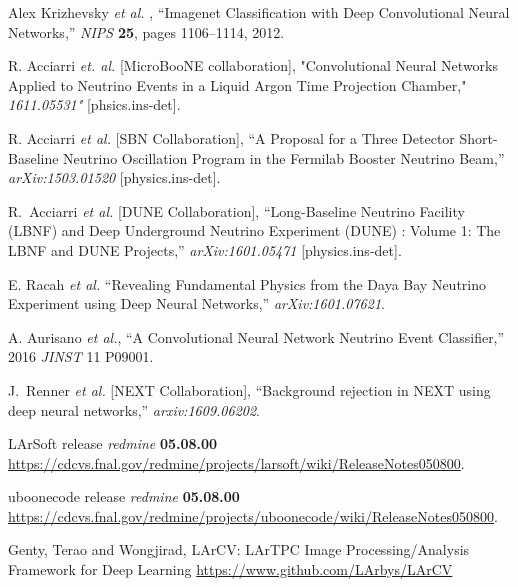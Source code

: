 \documentclass[11pt,a4paper]{article}
\begin{document}

\newpage
%
\begin{thebibliography}{9}

  Alex Krizhevsky {\it et al. },
  ``Imagenet Classification with Deep Convolutional Neural Networks,''
  \emph{NIPS} \textbf{25}, pages 1106–1114, 2012.

R. Acciarri {\it et. al.} [MicroBooNE collaboration],
"Convolutional Neural Networks Applied to Neutrino Events in a Liquid Argon Time Projection Chamber,"
\emph{1611.05531"} [phsics.ins-det].

R. Acciarri {\it et al.} [SBN Collaboration],
``A Proposal for a Three Detector Short-Baseline Neutrino Oscillation Program in the Fermilab Booster Neutrino Beam,''
\emph{arXiv:1503.01520} [physics.ins-det].

R.~Acciarri {\it et al.} [DUNE Collaboration],
  ``Long-Baseline Neutrino Facility (LBNF) and Deep Underground Neutrino Experiment (DUNE) : Volume 1: The LBNF and DUNE Projects,''
  \emph{arXiv:1601.05471} [physics.ins-det].

E. Racah {\it et al.} ``Revealing Fundamental Physics from the Daya Bay Neutrino Experiment using Deep Neural Networks,'' \emph{arXiv:1601.07621}.

A. Aurisano {\it et al.}, ``A Convolutional Neural Network Neutrino Event Classifier,'' 2016 \emph{JINST} 11 P09001.

J.~Renner {\it et al.} [NEXT Collaboration],
``Background rejection in NEXT using deep neural networks,''
\emph{arxiv:1609.06202}.

LArSoft release {\it redmine} \textbf{05.08.00} \protect\url{https://cdcvs.fnal.gov/redmine/projects/larsoft/wiki/ReleaseNotes050800}.

uboonecode release {\it redmine} \textbf{05.08.00} \protect\url{https://cdcvs.fnal.gov/redmine/projects/uboonecode/wiki/ReleaseNotes050800}.

 Genty, Terao and Wongjirad, LArCV: LArTPC Image Processing/Analysis Framework for Deep Learning \protect\url{https://www.github.com/LArbys/LArCV} %
 

\end{thebibliography}
\end{document}
